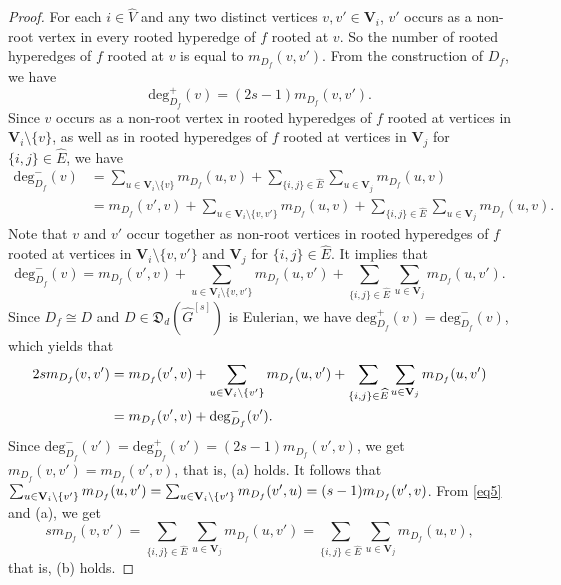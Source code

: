 \documentclass{article}
\begin{document}
\begin{proof}
For each $i \in \widehat{V}$ and any two distinct vertices $v,v' \in \mathbf{V}_{i}$,
$v'$ occurs as a non-root vertex in every rooted hyperedge of $f$ rooted at $v$.
So the number of rooted hyperedges of $f$ rooted at $v$ is equal to $m_{D_f}(v,v')$.
From the construction of $D_f$,
we have $$\mathrm{deg}_{D_f}^{+}(v)=(2s-1)m_{D_f}(v,v').$$
Since $v$ occurs as a non-root vertex in rooted hyperedges of $f$ rooted at vertices in $\mathbf{V}_{i}\setminus\{v\}$,
as well as in rooted hyperedges of $f$ rooted at vertices in $\mathbf{V}_{j}$ for $\{i,j\}\in\widehat{E}$,
we have
\begin{align*}
\mathrm{deg}_{D_f}^{-}(v)&=\sum_{u \in \mathbf{V}_{i}\setminus\{v\}}m_{D_f}(u,v)+\sum_{\{i,j\} \in \widehat{E}}\sum_{u \in \mathbf{V}_{j}}m_{D_f}(u,v)\\
&=m_{D_f}(v',v)+\sum_{u \in \mathbf{V}_{i}\setminus\{v,v'\}}m_{D_f}(u,v)+\sum_{\{i,j\} \in \widehat{E}}\sum_{u \in \mathbf{V}_{j}}m_{D_f}(u,v).
\end{align*}
Note that $v$ and $v'$ occur together as non-root vertices in rooted hyperedges of $f$ rooted at vertices in $\mathbf{V}_{i}\setminus\{v,v'\}$ and $\mathbf{V}_{j}$ for $\{i,j\} \in \widehat{E}$.
It implies that $$\mathrm{deg}_{D_f}^{-}(v)=m_{D_f}(v',v)+\sum_{u \in \mathbf{V}_{i}\setminus\{v,v'\}}m_{D_f}(u,v')+\sum_{\{i,j\} \in \widehat{E}}\sum_{u \in \mathbf{V}_{j}}m_{D_f}(u,v').$$
Since $D_f \cong D$ and $D \in \mathfrak{D}_{d}(\widehat{G}^{[s]})$ is Eulerian,
we have $\mathrm{deg}_{D_f}^{+}(v)=\mathrm{deg}_{D_f}^{-}(v)$,
which yields that
\begin{align}\label{eq5}
2sm_{D_f}(v,v')
&=m_{D_f}(v',v)+\sum_{u \in \mathbf{V}_{i}\setminus\{v'\}}m_{D_f}(u,v')+\sum_{\{i,j\} \in \widehat{E}}\sum_{u \in \mathbf{V}_{j}}m_{D_f}(u,v')\\
&=m_{D_f}(v',v)+\mathrm{deg}_{D_f}^{-}(v').\notag
\end{align}
Since $\mathrm{deg}_{D_f}^{-}(v')=\mathrm{deg}_{D_f}^{+}(v')=(2s-1)m_{D_f}(v',v)$,
we get $m_{D_f}(v,v')=m_{D_f}(v',v)$,
that is, (a) holds.
It follows that $\sum_{u \in \mathbf{V}_{i}\setminus\{v'\}}m_{D_f}(u,v')=\sum_{u \in \mathbf{V}_{i}\setminus\{v'\}}m_{D_f}(v',u)\\=(s-1)m_{D_f}(v',v)$.
From \eqref{eq5} and (a),
we get$$sm_{D_f}(v,v')=\sum_{\{i,j\} \in \widehat{E}}\sum_{u \in \mathbf{V}_{j}}m_{D_f}(u,v')=\sum_{\{i,j\} \in \widehat{E}}\sum_{u \in \mathbf{V}_{j}}m_{D_f}(u,v),$$
that is, (b) holds.
\end{proof}
\end{document}
